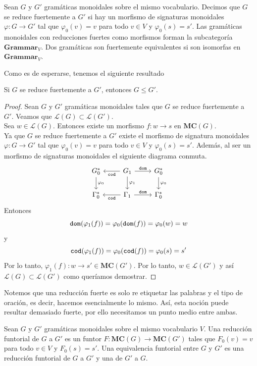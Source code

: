 \documentclass[../main.tex]{subfiles}
\begin{document}
	\begin{dfn}
		Sean $G$ y $G'$ gramáticas monoidales sobre el mismo vocabulario. Decimos que $G$ se reduce fuertemente a $G'$ si hay un morfismo de signaturas monoidales 	$\varphi: G \to G'$ tal que $\varphi_0(v)=v$ para todo $v \in V$ y $\varphi_0(s)=s'$. Las gramáticas monoidales con reducciones fuertes como morfismos forman la subcategoría $\textbf{Grammar}_V$. Dos gramáticas son fuertemente equivalentes si son isomorfas en $\textbf{Grammar}_V$. 
	\end{dfn}
	
	Como es de esperarse, tenemos el siguiente resultado
	
	\begin{prop}
		Si $G$ se reduce fuertemente a $G'$, entonces $G\leq G'$.
	\end{prop}
	\begin{proof}
		Sean $G$ y $G'$ gramáticas monoidales tales que $G$ se reduce fuertemente a $G'$. Veamos que $\mathcal{L}(G) \subset \mathcal{L}(G')$.\\
		Sea $w \in \mathcal{L}(G)$. Entonces existe un morfismo $f:w \to s$ en $\textbf{MC}(G)$.\\
		Ya que $G$ se reduce fuertemente a $G'$ existe el morfismo de signatura monoidales $\varphi: G \to G'$ tal que $\varphi_0(v)=v$ para todo $v \in V$ y $\varphi_0(s)=s'$. Además, al ser un morfismo de signaturas monoidales el siguiente diagrama conmuta.
		\[
		\begin{tikzcd}
			G_0^* \arrow{d}{\phi_0} & G_1 \arrow{r}{\tt{dom}} \arrow{l}{\tt{cod}} \arrow{d}{\phi_1} & G_0^* \arrow{d}{\phi_0} \\
			\Gamma_0^* & \Gamma_1 \arrow{r}{\tt{dom}} \arrow{l}{\tt{cod}} & \Gamma_0^*
		\end{tikzcd}
		\]
		Entonces
		$${\tt{dom}}(\varphi_1(f))=\varphi_0({\tt{dom}}(f))=\varphi_0(w)=w$$
		y 
		$${\tt{cod}}(\varphi_1(f))=\varphi_0({\tt{cod}}(f))=\varphi_0(s)=s'$$
		Por lo tanto, $\varphi_1(f):w \to s' \in \textbf{MC}(G')$. Por lo tanto, $w \in \mathcal{L}(G')$ y así $\mathcal{L}(G) \subset \mathcal{L}(G')$ como queríamos demostrar. 
	\end{proof}
	
	Notemos que una reducción fuerte es solo re etiquetar las palabras y el tipo de oración, es decir, hacemos esencialmente lo mismo. Así, esta noción puede resultar demasiado fuerte, por ello necesitamos un punto medio entre ambas.
	
	\begin{dfn}
		Sean $G$ y $G'$ gramáticas monoidales sobre el mismo vocabulario $V$. Una reducción funtorial de $G$ a $G'$ es un funtor $F: \textbf{MC}(G) \to \textbf{MC}(G')$ tales que $F_0(v)=v$ para todo $v \in V$ y $F_0(s)=s'$. Una equivalencia funtorial entre $G$ y $G'$ es una reducción funtorial de $G$ a $G'$ y una de $G'$ a $G$. 
	\end{dfn}
	
\end{document}
